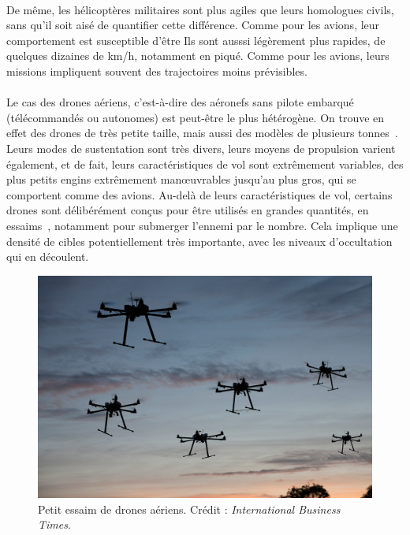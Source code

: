 	\paragraph{}
	De même, les hélicoptères militaires sont plus agiles que leurs homologues civils, sans qu'il soit aisé de quantifier cette différence. Comme pour les avions, leur comportement est susceptible d'être  Ils sont ausssi légèrement plus rapides, de quelques dizaines de km/h, notamment en piqué. Comme pour les avions, leurs missions impliquent souvent des trajectoires moins prévisibles.
	
	\paragraph{}
	Le cas des drones aériens, c'est-à-dire des aéronefs sans pilote embarqué (télécommandés ou autonomes) est peut-être le plus hétérogène. On trouve en effet des drones de très petite taille, mais aussi des modèles de plusieurs tonnes~\cite{reaper}. Leurs modes de sustentation sont très divers, leurs moyens de propulsion varient également, et de fait, leurs caractéristiques de vol sont extrêmement variables, des plus petits engins extrêmement manœuvrables jusqu'au plus gros, qui se comportent comme des avions. Au-delà de leurs caractéristiques de vol, certains drones sont délibérément conçus pour être utilisés en grandes quantités, en essaims~\cite{locust, alonso2016distributed, saska2014autonomous}, notamment pour submerger l'ennemi par le nombre. Cela implique une densité de cibles potentiellement très importante, avec les niveaux d'occultation qui en découlent.
	
	\begin{figure}[ht]
		\centering
		\includegraphics[width=\textwidth]{figures/swarm}
		\caption{Petit essaim de drones aériens. Crédit : \emph{International Business Times}.}
		\label{fig:swarm}
	\end{figure}
	
